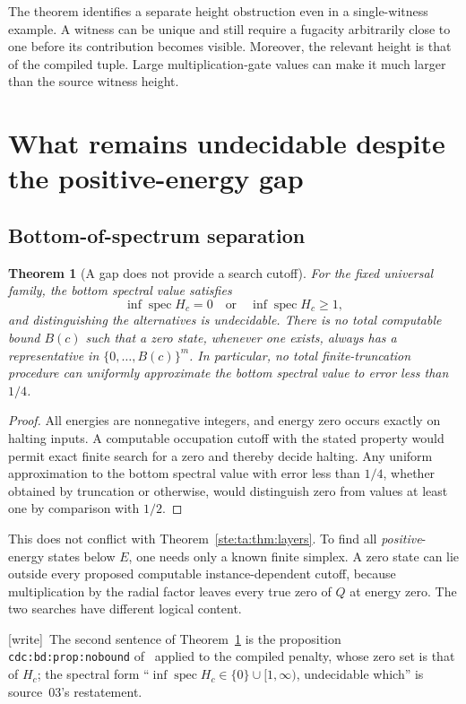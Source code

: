 \documentclass[11pt,letterpaper]{article}
\newtheorem{theorem}{Theorem}[section]
\theoremstyle{definition}
\theoremstyle{remark}
\DeclareMathOperator{\Spec}{spec}
\newcommand{\wtag}{\textup{[write]}}
\begin{document}
The theorem identifies a separate height obstruction even in a single-witness example. A witness can be unique and still require a fugacity arbitrarily close to one before its contribution becomes visible. Moreover, the relevant height is that of the compiled tuple. Large multiplication-gate values can make it much larger than the source witness height.

\section{What remains undecidable despite the positive-energy gap}\label{ste:ta:sec:gap}
\subsection{Bottom-of-spectrum separation}
\begin{theorem}[A gap does not provide a search cutoff]\label{ste:ta:thm:gap}
For the fixed universal family, the bottom spectral value satisfies
\[
\inf\Spec H_c=0\quad\text{or}\quad\inf\Spec H_c\ge1,
\]
and distinguishing the alternatives is undecidable. There is no total computable bound $B(c)$ such that a zero state, whenever one exists, always has a representative in $\{0,\ldots,B(c)\}^m$. In particular, no total finite-truncation procedure can uniformly approximate the bottom spectral value to error less than $1/4$.
\end{theorem}
\begin{proof}
All energies are nonnegative integers, and energy zero occurs exactly on halting inputs. A computable occupation cutoff with the stated property would permit exact finite search for a zero and thereby decide halting. Any uniform approximation to the bottom spectral value with error less than $1/4$, whether obtained by truncation or otherwise, would distinguish zero from values at least one by comparison with $1/2$.
\end{proof}

This does not conflict with Theorem~\ref{ste:ta:thm:layers}. To find all \emph{positive}-energy states below $E$, one needs only a known finite simplex. A zero state can lie outside every proposed computable instance-dependent cutoff, because multiplication by the radial factor leaves every true zero of $Q$ at energy zero. The two searches have different logical content.

\wtag\ The second sentence of Theorem~\ref{ste:ta:thm:gap} is the proposition \texttt{cdc:bd:prop:nobound} of~\cite{cdc} applied to the compiled penalty, whose zero set is that of $H_c$; the spectral form ``$\inf\Spec H_c\in\{0\}\cup[1,\infty)$, undecidable which'' is source~03's restatement.
\end{document}
